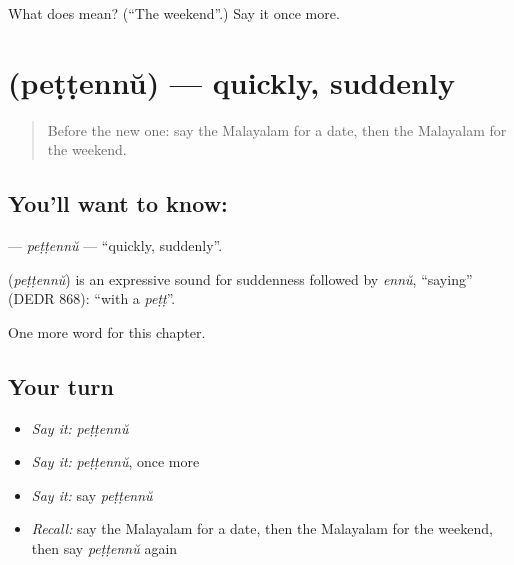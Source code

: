\begin{tcolorbox}[breakable,colback=teal!4,colframe=teal!35!black,title={Before you move on}]
What does  mean? (\textquotedblleft{}The weekend\textquotedblright{}.) Say it once more.
\end{tcolorbox}
\section[\texorpdfstring{\ml{പെട്ടെന്ന്} (peṭṭennŭ)}{പെട്ടെന്ന് (peṭṭennŭ)}]{ (peṭṭennŭ) — quickly, suddenly}

\label{lesson:ML-C195-pettennu}



\begin{quote}
Before the new one: say the Malayalam for a date, then the Malayalam for the weekend.
\end{quote}

\subsection*{You'll want to know: }
\textbf{} — \emph{peṭṭennŭ} — \textquotedblleft{}quickly, suddenly\textquotedblright{}.

\begin{cousinweb}
\textbf{} (\emph{peṭṭennŭ}) is an expressive sound for suddenness followed by \emph{ennŭ}, \textquotedblleft{}saying\textquotedblright{} (DEDR 868): \textquotedblleft{}with a \emph{peṭṭ}\textquotedblright{}.
\end{cousinweb}

\begin{grammarlens}[title={What you've built}]
One more word for this chapter.
\end{grammarlens}

\subsection*{Your turn}
\begin{itemize}
\raggedright
  \item \emph{Say it:} \emph{peṭṭennŭ}
  \item \emph{Say it:} \emph{peṭṭennŭ}, once more
  \item \emph{Say it:} say \emph{peṭṭennŭ}
  \item \emph{Recall:} say the Malayalam for a date, then the Malayalam for the weekend, then say \emph{peṭṭennŭ} again
\end{itemize}

